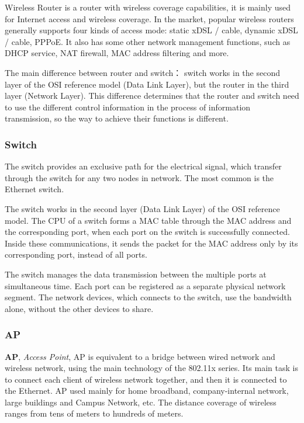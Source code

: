 Wireless Router is a router with wireless coverage capabilities, it is mainly used for Internet access and wireless coverage. In the market, popular wireless routers generally supports four kinds of access mode: static xDSL / cable, dynamic xDSL / cable, PPPoE. It also has some other network management functions, such as DHCP service, NAT firewall, MAC address filtering and more. 

The main difference between router and switch： switch works in the second layer of the OSI reference model (Data Link Layer),  but the router in the third layer (Network Layer). This difference determines that the router and switch need to use the different control information in the process of information transmission, so the way to achieve their functions is different. 

\subsubsection{Switch}

The switch provides an exclusive path for the electrical signal, which transfer through the switch for any two nodes in network. The most common is the Ethernet switch.  

The switch works in the second layer (Data Link Layer) of the OSI reference model. The CPU of a switch forms a MAC table through the MAC address and the corresponding port, when each port on the switch is successfully connected. Inside these communications, it sends the packet for the MAC address only by its corresponding port, instead of all ports.  

The switch manages the data transmission between the multiple ports at simultaneous time. Each port can be registered as a separate physical network segment. The network devices, which connects to the switch, use the bandwidth alone, without the other devices to share.

\subsubsection{AP}

\textbf{AP}, \textit{Access Point}, AP is equivalent to a bridge between wired network and wireless network, using the main technology of the 802.11x series. Its main task is to connect each client of wireless network together, and then it is connected to the Ethernet. AP used mainly for home broadband, company-internal network, large buildings and Campus Network, etc. The distance coverage of wireless ranges from tens of meters to hundreds of meters.  

